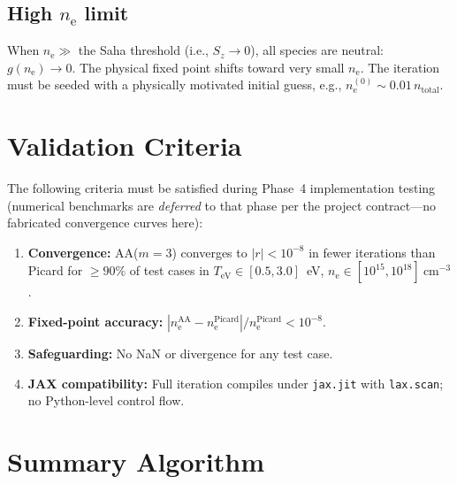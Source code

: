 \documentclass[11pt]{article}
\newcommand{\ne}{n_\mathrm{e}}
\newcommand{\TeV}{T_\mathrm{eV}}
\begin{document}
\subsection{High $\ne$ limit}

When $\ne \gg$ the Saha threshold (i.e., $S_z \to 0$), all species are
neutral: $g(\ne) \to 0$.  The physical fixed point shifts toward very
small $\ne$.  The iteration must be seeded with a physically motivated
initial guess, e.g., $\ne^{(0)} \sim 0.01\,n_\mathrm{total}$.


\section{Validation Criteria}
\label{sec:validation}

The following criteria must be satisfied during Phase~4 implementation
testing (numerical benchmarks are \emph{deferred} to that phase per the
project contract---no fabricated convergence curves here):

\begin{enumerate}
  \item \textbf{Convergence:} AA($m=3$) converges to $|r| < 10^{-8}$ in
    fewer iterations than Picard for $\ge 90\%$ of test cases in
    $\TeV \in [0.5, 3.0]$~eV, $\ne \in [10^{15}, 10^{18}]~\mathrm{cm}^{-3}$.
  \item \textbf{Fixed-point accuracy:}
    $|\ne^\mathrm{AA} - \ne^\mathrm{Picard}| / \ne^\mathrm{Picard} < 10^{-8}$.
  \item \textbf{Safeguarding:} No NaN or divergence for any test case.
  \item \textbf{JAX compatibility:} Full iteration compiles under
    \texttt{jax.jit} with \texttt{lax.scan}; no Python-level control flow.
\end{enumerate}


\section*{Summary Algorithm}
\end{document}
